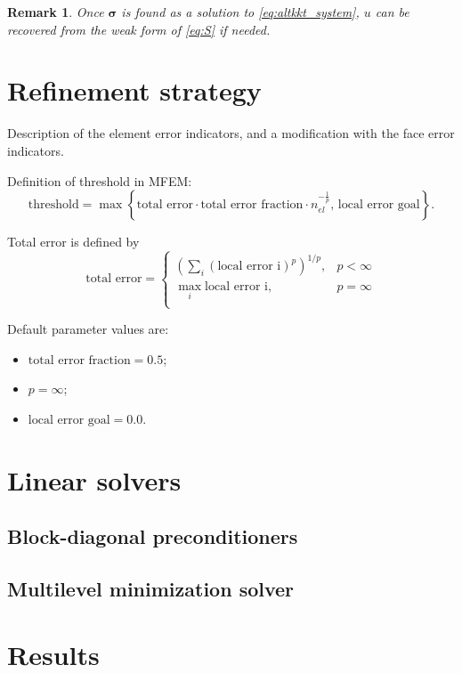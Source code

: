 \documentclass[a4paper,12pt]{amsart}
\numberwithin{equation}{section}
\newtheorem{remark}{Remark}[section]
\def\bsigma{{\boldsymbol \sigma}}
\begin{document}
\begin{remark}
Once $\bsigma$ is found as a solution to \eqref{eq:altkkt_system}, $u$ can be recovered from the weak form of \eqref{eq:S} if needed.
\end{remark}


\section{Refinement strategy}
Description of the element error indicators, and a modification with the face error indicators.

Definition of threshold in MFEM:
$$
\mbox{threshold} = \max \left\lbrace \mbox{total error} \cdot \mbox{total error fraction} \cdot n_{el}^{-\frac{1}{p}}, \, \mbox{local error goal} \right\rbrace.
$$

Total error is defined by
$$
\mbox{total error}  = 
\left\{ 
\begin{array}{lc}
\left( \sum_i \left(\mbox{local error i}\right)^p \right)^{1/p}, & p < \infty \\
\max_i \mbox{local error i}, & p = \infty \\
\end{array}
\right.
$$

Default parameter values are:
\begin{itemize}
	\item $\mbox{total error fraction} = 0.5$;
	\item $p = \infty$;
	\item $\mbox{local error goal} = 0.0$.
\end{itemize}

\section{Linear solvers}

\subsection{Block-diagonal preconditioners}

\subsection{Multilevel minimization solver}

\section{Results}
\end{document}
